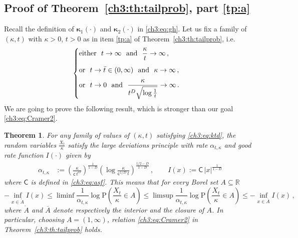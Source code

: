 \documentclass[a4paper,reqno,11pt]{amsart}
\numberwithin{equation}{section}
\newtheorem{theorem}{Theorem}[section]
\newcommand{\R}{\mathbb{R}}
\newcommand{\PEfont}{\mathrm}
\renewcommand{\P}{\ensuremath{\PEfont P}}
\newcommand\sfc{\mathsf{c}}
\newcommand\sfC{\mathsf{C}}
\newcommand\bkappa{\boldsymbol{\kappa}}
\begin{document}
\subsection{Proof of Theorem~\ref{ch3:th:tailprob}, part \eqref{tp:a}}

Recall the definition of $\bkappa_1(\cdot)$ and $\bkappa_2(\cdot)$ in \eqref{ch3:eq:gh}.
Let us fix a family of $(\kappa,t)$ with $\kappa > 0$, $t > 0$ as in item \eqref{tp:a}
of Theorem~\ref{ch3:th:tailprob}, i.e.\
\begin{equation}\label{ch3:eq:ktd}
	\begin{cases}
	\displaystyle
	\text{either } \
	t \to \infty \ \text{ and } \ \frac{\kappa}{t} \to \infty \,,\\
	\displaystyle
	\rule{0pt}{1.7em}
	\text{or } \
	t \to \bar t \in (0,\infty) \ \text{ and } \ \kappa \to\infty \,,\\
	\displaystyle
	\rule{0pt}{1.7em}
	\text{or } \
	t \to 0 \ \text{ and } \ \frac{\kappa}{t^D 
	\sqrt{\log \frac{1}{t}}} \to \infty \,.
	\end{cases}
\end{equation}
We are going to prove the following result, which is stronger than
our goal \eqref{ch3:eq:Cramer2}.

\begin{theorem}\label{ch3:th:LDP+}
For any family of values of
$(\kappa,t)$ satisfying \eqref{ch3:eq:ktd}, the random variables
$\frac{X_t}{\kappa}$ satisfy
the \emph{large deviations principle}
with rate $\alpha_{t,\kappa}$ and good rate function $I(\cdot)$ given by
\begin{equation}\label{ch3:eq:gtIx}
\begin{split}
 \alpha_{t,\kappa} & :=\left( \frac{\kappa}{\sfc \, t^D}\right)
 ^{\frac{1}{1-D}}\left(\log \frac{\kappa}{\sfc^{1/D} \,t}\right)
 ^{\frac{1/2-D}{1-D}} \,, \qquad
 I(x) := \sfC \, |x|^{\frac{1}{1-D}} 
\end{split}
\end{equation}
where $\sfC$ is defined in \eqref{ch3:eq:asf}.
This means that for every Borel set $A \subseteq \R$
\begin{equation*}
	-\inf_{x\in \mathring{A}} I(x) \le 
	\liminf \frac{1}{\alpha_{t,\kappa}} 
	\log \P\left(\frac{X_{t}}{\kappa} \in A\right)
	\le \limsup
	\frac{1}{\alpha_{t,\kappa}} \log \P\left(\frac{X_{t}}{\kappa} \in A\right) 
	\le -\inf_{x\in \overline{A}} I(x) \,,
\end{equation*}
where $\mathring{A}$ and $\overline{A}$ denote respectively
the interior and the closure of $A$. 
In particular, choosing $A = (1,\infty)$,
relation \eqref{ch3:eq:Cramer2} in Theorem~\ref{ch3:th:tailprob} holds.
\end{theorem}
\end{document}
